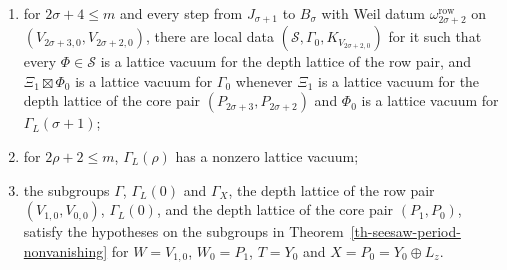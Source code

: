 \begin{definition}
\begin{enumerate}
  for $\Gamma_L(\rho)$, where $\kappa_\rho(w)=(\tau_\rho w)^*$;
\item for $2\sigma+4\leq m$ and every step from $J_{\sigma+1}$ to $B_\sigma$ with
  Weil datum $\omega^{\mathrm{row}}_{2\sigma+2}$ on
  $(V_{2\sigma+3,0},V_{2\sigma+2,0})$, there are local data
  $(\mathcal S,\Gamma_0,K_{V_{2\sigma+2,0}})$ for it such that every
  $\Phi\in\mathcal S$ is a lattice vacuum for the depth lattice of the row pair,
  and $\Xi_1\boxtimes\Phi_0$ is a lattice vacuum for $\Gamma_0$ whenever $\Xi_1$
  is a lattice vacuum for the depth lattice of the core pair
  $(P_{2\sigma+3},P_{2\sigma+2})$ and $\Phi_0$ is a lattice vacuum for
  $\Gamma_L(\sigma+1)$;
\item for $2\rho+2\leq m$, $\Gamma_L(\rho)$ has a nonzero lattice vacuum;
\item the subgroups $\Gamma$, $\Gamma_L(0)$ and $\Gamma_X$, the depth lattice of
  the row pair $(V_{1,0},V_{0,0})$, $\Gamma_L(0)$, and the depth lattice of the
  core pair $(P_1,P_0)$, satisfy the hypotheses on the subgroups in
  Theorem~\ref{th-seesaw-period-nonvanishing} for $W=V_{1,0}$, $W_0=P_1$,
  $T=Y_0$ and $X=P_0=Y_0\oplus L_z$.
\end{enumerate}
\end{definition}

